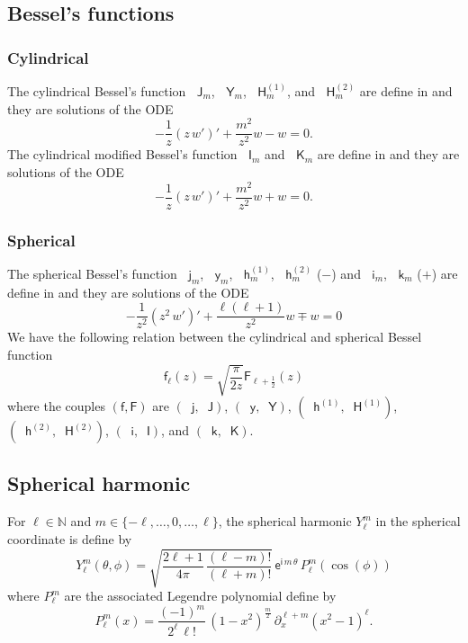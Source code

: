 \documentclass[12pt,a4paper]{article}
\theoremstyle{definition}
\theoremstyle{plain}
\theoremstyle{remark}
\newcommand{\bbN}{\mathbb{N}}
\newcommand{\ex}{\mathsf{e}}
\newcommand{\im}{\mathsf{i}}
\newcommand{\bJ}{\mathop{}\!\mathsf{J}}
\newcommand{\bY}{\mathop{}\!\mathsf{Y}}
\newcommand{\Hu}{\mathop{}\!\mathsf{H}^{(1)}}
\newcommand{\Hd}{\mathop{}\!\mathsf{H}^{(2)}}
\newcommand{\bI}{\mathop{}\!\mathsf{I}}
\newcommand{\bK}{\mathop{}\!\mathsf{K}}
\newcommand{\bj}{\mathop{}\!\mathsf{j}}
\newcommand{\by}{\mathop{}\!\mathsf{y}}
\newcommand{\hu}{\mathop{}\!\mathsf{h}^{(1)}}
\newcommand{\hd}{\mathop{}\!\mathsf{h}^{(2)}}
\newcommand{\bi}{\mathop{}\!\mathsf{i}}
\newcommand{\bk}{\mathop{}\!\mathsf{k}}
\newcommand{\plr}[1]{\left(#1\right)}
\begin{document}
\subsection{Bessel's functions}

%
\subsubsection{Cylindrical}
%

The cylindrical Bessel's function $\bJ_m$, $\bY_m$, $\Hu_m$, and $\Hd_m$ are define in \cite[Sec.~10.2]{NIST:DLMF} and they are solutions of the ODE
\[
    -\frac{1}{z}\plr{z\, w'}' + \frac{m^2}{z^2}w - w = 0.
\]
The cylindrical modified Bessel's function $\bI_m$ and $\bK_m$ are define in \cite[Sec.~10.25]{NIST:DLMF} and they are solutions of the ODE
\[
    -\frac{1}{z}\plr{z\, w'}' + \frac{m^2}{z^2}w + w = 0.
\]

%
\subsubsection{Spherical}
%

The spherical Bessel's function $\bj_m$, $\by_m$, $\hu_m$, $\hd_m$ ($-$) and $\bi_m$, $\bk_m$ ($+$) are define in \cite[Sec.~10.47]{NIST:DLMF} and they are solutions of the ODE
\[
    -\frac{1}{z^2}\plr{z^2\, w'}' + \frac{\ell(\ell+1)}{z^2}w \mp w = 0
\]
We have the following relation between the cylindrical and spherical Bessel function
\[
    \mathsf{f}_\ell(z) = \sqrt{\frac{\pi}{2z}} \mathsf{F}_{\ell+\frac{1}{2}}(z)
\]
where the couples $(\mathsf{f}, \mathsf{F})$ are $(\bj, \bJ)$, $(\by, \bY)$, $(\hu, \Hu)$, $(\hd, \Hd)$, $(\bi, \bI)$, and $(\bk, \bK)$.

\subsection{Spherical harmonic}

For $\ell \in \bbN$ and $m \in \{-\ell, \ldots, 0, \ldots, \ell\}$, the spherical harmonic $Y_\ell^m$ in the spherical coordinate is define by
\[
    Y_\ell^m(\theta, \phi) = \sqrt{\frac{2\ell+1}{4\pi}\, \frac{(\ell-m)!
        }{(\ell+m)!}}\, \ex^{\im\, m\, \theta}\, P_\ell^m(\cos(\phi))
\]
where $P_\ell^m$ are the associated Legendre polynomial define by
\[
    P_\ell^m(x) = \frac{(-1)^m}{2^\ell\, \ell!}\, (1-x^2)^{\frac{m}{2}}\, \partial_x^{\ell+m} (x^2-1)^\ell.
\]
\end{document}
